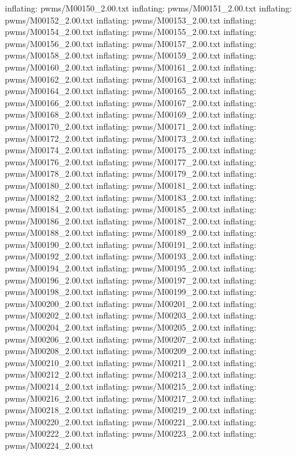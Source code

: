 \documentclass[letterpaper,10pt,english]{sphinxmanual}
\begin{document}
{\begin{sphinxVerbatim}[commandchars=\\\{\}]
  inflating: pwms/M00150\_2.00.txt
  inflating: pwms/M00151\_2.00.txt
  inflating: pwms/M00152\_2.00.txt
  inflating: pwms/M00153\_2.00.txt
  inflating: pwms/M00154\_2.00.txt
  inflating: pwms/M00155\_2.00.txt
  inflating: pwms/M00156\_2.00.txt
  inflating: pwms/M00157\_2.00.txt
  inflating: pwms/M00158\_2.00.txt
  inflating: pwms/M00159\_2.00.txt
  inflating: pwms/M00160\_2.00.txt
  inflating: pwms/M00161\_2.00.txt
  inflating: pwms/M00162\_2.00.txt
  inflating: pwms/M00163\_2.00.txt
  inflating: pwms/M00164\_2.00.txt
  inflating: pwms/M00165\_2.00.txt
  inflating: pwms/M00166\_2.00.txt
  inflating: pwms/M00167\_2.00.txt
  inflating: pwms/M00168\_2.00.txt
  inflating: pwms/M00169\_2.00.txt
  inflating: pwms/M00170\_2.00.txt
  inflating: pwms/M00171\_2.00.txt
  inflating: pwms/M00172\_2.00.txt
  inflating: pwms/M00173\_2.00.txt
  inflating: pwms/M00174\_2.00.txt
  inflating: pwms/M00175\_2.00.txt
  inflating: pwms/M00176\_2.00.txt
  inflating: pwms/M00177\_2.00.txt
  inflating: pwms/M00178\_2.00.txt
  inflating: pwms/M00179\_2.00.txt
  inflating: pwms/M00180\_2.00.txt
  inflating: pwms/M00181\_2.00.txt
  inflating: pwms/M00182\_2.00.txt
  inflating: pwms/M00183\_2.00.txt
  inflating: pwms/M00184\_2.00.txt
  inflating: pwms/M00185\_2.00.txt
  inflating: pwms/M00186\_2.00.txt
  inflating: pwms/M00187\_2.00.txt
  inflating: pwms/M00188\_2.00.txt
  inflating: pwms/M00189\_2.00.txt
  inflating: pwms/M00190\_2.00.txt
  inflating: pwms/M00191\_2.00.txt
  inflating: pwms/M00192\_2.00.txt
  inflating: pwms/M00193\_2.00.txt
  inflating: pwms/M00194\_2.00.txt
  inflating: pwms/M00195\_2.00.txt
  inflating: pwms/M00196\_2.00.txt
  inflating: pwms/M00197\_2.00.txt
  inflating: pwms/M00198\_2.00.txt
  inflating: pwms/M00199\_2.00.txt
  inflating: pwms/M00200\_2.00.txt
  inflating: pwms/M00201\_2.00.txt
  inflating: pwms/M00202\_2.00.txt
  inflating: pwms/M00203\_2.00.txt
  inflating: pwms/M00204\_2.00.txt
  inflating: pwms/M00205\_2.00.txt
  inflating: pwms/M00206\_2.00.txt
  inflating: pwms/M00207\_2.00.txt
  inflating: pwms/M00208\_2.00.txt
  inflating: pwms/M00209\_2.00.txt
  inflating: pwms/M00210\_2.00.txt
  inflating: pwms/M00211\_2.00.txt
  inflating: pwms/M00212\_2.00.txt
  inflating: pwms/M00213\_2.00.txt
  inflating: pwms/M00214\_2.00.txt
  inflating: pwms/M00215\_2.00.txt
  inflating: pwms/M00216\_2.00.txt
  inflating: pwms/M00217\_2.00.txt
  inflating: pwms/M00218\_2.00.txt
  inflating: pwms/M00219\_2.00.txt
  inflating: pwms/M00220\_2.00.txt
  inflating: pwms/M00221\_2.00.txt
  inflating: pwms/M00222\_2.00.txt
  inflating: pwms/M00223\_2.00.txt
  inflating: pwms/M00224\_2.00.txt

\end{sphinxVerbatim}}
\end{document}
